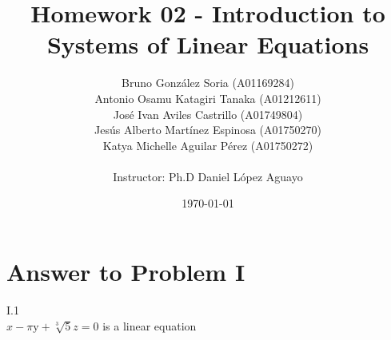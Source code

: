 \documentclass[11pt,a4paper]{article}
\title
{
    Homework 02 - Introduction to Systems of Linear Equations
}
\author
{    
    Bruno Gonz{\' a}lez Soria (A01169284)  \\
    Antonio Osamu Katagiri Tanaka (A01212611) \\
    Jos{\' e} Ivan Aviles Castrillo (A01749804) \\
    Jes{\' u}s Alberto Mart{\' i}nez Espinosa (A01750270) \\
    Katya Michelle Aguilar P{\' e}rez (A01750272) \\
    \\
    Instructor: Ph.D Daniel L{\' o}pez Aguayo
}
\date{\today}
\providecommand{\keywords}[1]
{
    \\
    \\
    \small
    \textbf{\textit{Keywords:}} #1
}
\begin{document}
\setlength\parindent{0pt} %


\maketitle


\clearpage








\section{Answer to Problem I}\label{sec:P01}

I.1\\
\(x-\text{$\pi $y}+\sqrt[3]{5}z=0\) is a linear equation\\
\end{document}

